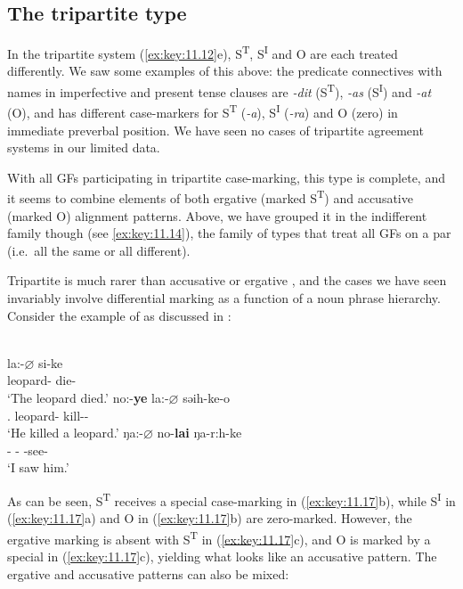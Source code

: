 \documentclass[output=paper]{langsci/langscibook}
\begin{document}
\subsection{The tripartite type}\label{sec:key:11.5.3}

In the tripartite system (\ref{ex:key:11.12}e), S\textsuperscript{T}, S\textsuperscript{I} and
O are each treated differently. We saw some examples of this above: the
predicate connectives with names in  imperfective and present
tense clauses are \emph{-dit} (S\textsuperscript{T}), \emph{-as}
(S\textsuperscript{I}) and \emph{-at} (O), and  has different
case-markers for S\textsuperscript{T} (\emph{-a}), S\textsuperscript{I}
(\emph{-ra}) and O (zero) in immediate preverbal position. We have seen no
cases of tripartite agreement systems in our limited data.

With all \glspl{GF} participating in tripartite
case-marking, this  type is complete, and it seems to combine elements
of both ergative (marked S\textsuperscript{T}) and accusative (marked O)
alignment patterns.  Above, we have grouped it in the indifferent family though
(see \eqref{ex:key:11.14}), the family of  types that treat all
\glspl{GF} on a par (i.e.\ all the same or all
different).

Tripartite  is much rarer than accusative or ergative 
\citep[40]{Dixon1994}, and the cases we have seen invariably involve
differential marking as a function of a noun phrase  hierarchy. Consider
the example of  as discussed in \textcite{Watters2002}:

\ea%
\label{ex:key:11.17}  \parencite[66--67]{Watters2002}\\
	\ea
		\gll la:-${\varnothing}$        si-ke\\
			leopard-\Abs{}  die-\Pfv{}\\
		\glt ‘The leopard died.’
	\ex
		\gll no:-\textbf{ye}    la:-${\varnothing}$        səih-ke-o\\
			\Tsg.\Erg{}  leopard-\Abs{}  kill-\Pfv{}-\Tsg{}\\
		\glt ‘He killed a leopard.’
	\ex
		\gll ŋa:-${\varnothing}$    no-\textbf{lai}    ŋa-r:h-ke\\
			\Fsg-\Nom{} \Tsg-\Acc{} \Fsg{}-see-\Pfv{}\\
		\glt ‘I saw him.’
	\z
\z

As can be seen, S\textsuperscript{T} receives a special case-marking in (\ref{ex:key:11.17}b),
while S\textsuperscript{I} in (\ref{ex:key:11.17}a) and O in (\ref{ex:key:11.17}b) are zero-marked. However,
the ergative marking is absent with S\textsuperscript{T} in (\ref{ex:key:11.17}c), and O is
marked by a special  in (\ref{ex:key:11.17}c), yielding what looks like an
accusative pattern. The ergative and accusative patterns can also be mixed:
\end{document}
